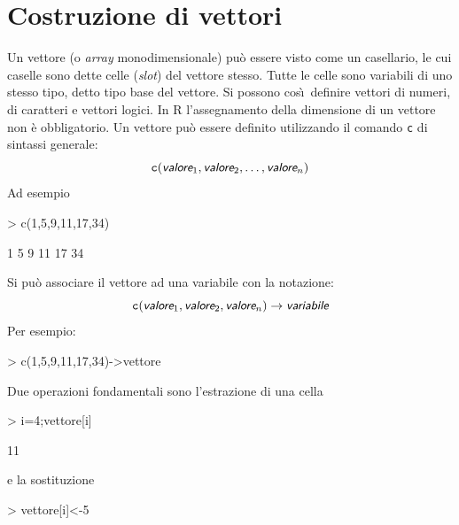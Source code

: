 \documentclass[onecolumn,11pt]{book}
\newcommand{\varia}[1]{\textsl{\textsf{#1}}}
\begin{document}
\section{Costruzione di vettori}  Un vettore (o \textit{array} monodimensionale) 
pu\`o essere visto come un casellario, le cui caselle sono dette celle (\emph{slot}) del vettore stesso. Tutte le celle sono variabili di uno stesso tipo, detto tipo base del vettore. Si possono cos\`\i\  definire vettori di numeri, di caratteri e vettori logici. 
In \textsf{R} l'assegnamento della dimensione di un vettore non \`e obbligatorio. %
Un vettore pu\`o  essere definito utilizzando il comando \texttt{c} di sintassi generale:  
\begin{equation*}
\texttt{c}(\varia{valore}_1, \varia{valore}_2, \ldots,\varia{valore}_n)
\end{equation*}
Ad esempio
\begin{Schunk}
\begin{Sinput}
>  c(1,5,9,11,17,34)
\end{Sinput}
\begin{Soutput}
[1]  1  5  9 11 17 34
\end{Soutput}
\end{Schunk}
Si pu\`o associare il vettore ad una variabile con la notazione:
\begin{equation*}
\texttt{c}(\varia{valore}_1, \varia{valore}_2, \varia{valore}_n)\rightarrow \varia{variabile}
\end{equation*}
Per esempio:
\begin{Schunk}
\begin{Sinput}
> c(1,5,9,11,17,34)->vettore
\end{Sinput}
\end{Schunk}
Due operazioni fondamentali sono l'estrazione di una cella
\begin{Schunk}
\begin{Sinput}
> i=4;vettore[i]
\end{Sinput}
\begin{Soutput}
[1] 11
\end{Soutput}
\end{Schunk}
e la sostituzione
\begin{Schunk}
\begin{Sinput}
> vettore[i]<-5
\end{Sinput}
\end{Schunk}
\end{document}
